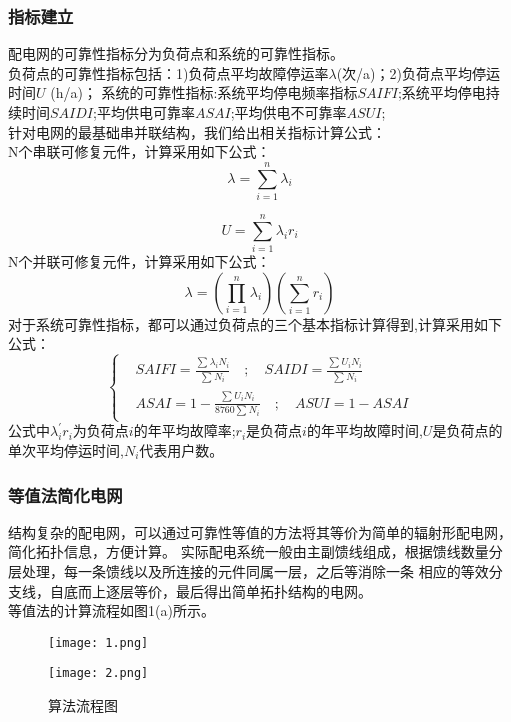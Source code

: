 \documentclass[withoutpreface,bwprint]{cumcmthesis} %
\begin{document}
\subsubsection{指标建立}
配电网的可靠性指标分为负荷点和系统的可靠性指标。\\
\indent 负荷点的可靠性指标包括：1)负荷点平均故障停运率$\lambda$(次/a)；2)负荷点平均停运时间$U$ (h/a)；
系统的可靠性指标:系统平均停电频率指标$SAIFI$;系统平均停电持续时间$SAIDI$;平均供电可靠率$ASAI$;平均供电不可靠率$ASUI$;\\
\indent 针对电网的最基础串并联结构，我们给出相关指标计算公式：\\
\indent N个串联可修复元件，计算采用如下公式：
\begin{equation}
    \lambda = \sum_{i=1}^{n}\lambda_i
\end{equation}

\begin{equation}
    U = \sum_{i = 1}^{n} \lambda_i r_i
\end{equation}
\indent N个并联可修复元件，计算采用如下公式：
\begin{equation}
    \lambda = (\prod_{i = 1}^{n}\lambda_i)(\sum_{i = 1}^{n}r_i)
\end{equation}
\indent 对于系统可靠性指标，都可以通过负荷点的三个基本指标计算得到,计算采用如下公式：
\begin{equation}
    \left\{
        \begin{aligned}
            &SAIFI = \frac{\sum_{}^{}\lambda_iN_i}{\sum_{}^{}N_i} \quad ; \quad SAIDI = \frac{\sum_{}^{}U_iN_i}{\sum_{}^{}N_i} \\ 
            &ASAI = 1 - \frac{\sum_{}^{}U_iN_i}{8760\sum_{}^{}N_i} \quad ; \quad ASUI = 1 - ASAI
        \end{aligned}
    \right.
\end{equation}
\indent 公式中$\lambda_i^{'} r_i$为负荷点$i$的年平均故障率;$r_i$是负荷点$i$的年平均故障时间,$U$是负荷点的单次平均停运时间,$N_i$代表用户数。\\

\subsubsection{等值法简化电网}
    结构复杂的配电网，可以通过可靠性等值的方法\cite{yy3}将其等价为简单的辐射形配电网，简化拓扑信息，方便计算。
    实际配电系统一般由主副馈线组成，根据馈线数量分层处理，每一条馈线以及所连接的元件同属一层，之后等消除一条
    相应的等效分支线，自底而上逐层等价，最后得出简单拓扑结构的电网。\\
\indent 等值法的计算流程如图1(a)所示。
\begin{figure}[htbp]
    \centering
    \begin{minipage}[c]{0.48\textwidth}
        \centering
        \texttt{[image: 1.png]}
        \label{g1}
    \end{minipage}
    \begin{minipage}[c]{0.48\textwidth}
        \centering
        \texttt{[image: 2.png]}
        \label{g2}
    \end{minipage}
    \caption{算法流程图}
    \label{gb}
\end{figure}
\end{document}
